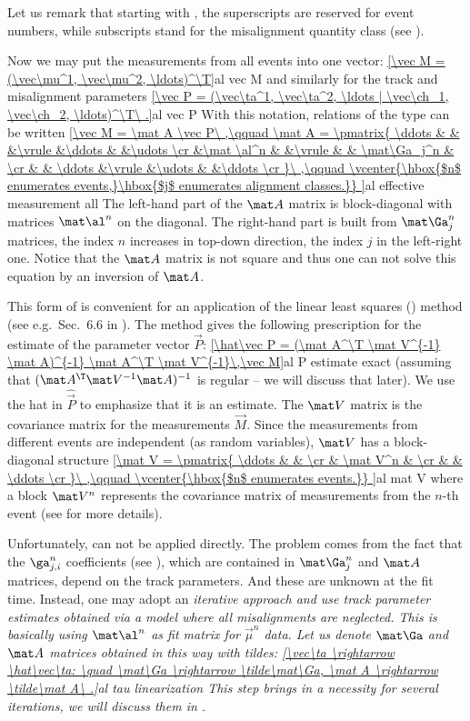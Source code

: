 Let us remark that starting with , the superscripts are reserved for event numbers, while subscripts stand for the misalignment quantity class (see ).

Now we may put the measurements from all events into one vector:
\eqref{\vec M = (\vec\mu^1, \vec\mu^2, \ldots)^\T}{al vec M}
and similarly for the track and misalignment parameters
\eqref{\vec P = (\vec\ta^1, \vec\ta^2, \ldots | \vec\ch_1, \vec\ch_2, \ldots)^\T\ .}{al vec P}
With this notation, relations of the type  can be written
\eqref{\vec M = \mat A \vec P\ ,\qquad
	\mat A = \pmatrix{
	\ddots & 		&		&\vrule	&\ddots	&				&\udots	\cr
		&\mat \al^n	&		&\vrule	&		& \mat\Ga_j^n	&	\cr
		&		& \ddots	&\vrule	&\udots	&				&\ddots	\cr
	}\ ,\qquad
	\vcenter{\hbox{$n$ enumerates events,}\hbox{$j$ enumerates alignment classes.}}
}{al effective measurement all}
The left-hand part of the $\mat A$ matrix is block-diagonal with matrices $\mat\al^n$ on the diagonal. The right-hand part is built from $\mat\Ga_j^n$ matrices, the index $n$ increases in top-down direction, the index $j$ in the left-right one. Notice that the $\mat A$ matrix is not square and thus one can not solve this equation by an inversion of $\mat A$.

This form of  is convenient for an application of the linear least squares () method (see e.g.~Sec.~6.6 in ). The method gives the following prescription for the estimate of the parameter vector $\vec P$:
\eqref{\hat\vec P = (\mat A^\T \mat V^{-1} \mat A)^{-1} \mat A^\T \mat V^{-1}\,\vec M}{al P estimate exact}
(assuming that $(\mat A^\T \mat V^{-1} \mat A)^{-1}$ is regular -- we will discuss that later). We use the hat in $\hat\vec P$ to emphasize that it is an estimate. The $\mat V$ matrix is the covariance matrix for the measurements $\vec M$. Since the measurements from different events are independent (as random variables), $\mat V$ has a block-diagonal structure
\eqref{\mat V = \pmatrix{
\ddots	&			&			\cr
		& \mat V^n	&			\cr
		&			& \ddots	\cr
	}\ ,\qquad
	\vcenter{\hbox{$n$ enumerates events.}}
}{al mat V}
where a block $\mat V^n$ represents the covariance matrix of measurements from the $n$-th event (see  for more details).

Unfortunately,  can not be applied directly. The problem comes from the fact that the $\ga^n_{j,i}$ coefficients (see ), which are contained in $\mat\Ga_j^n$ and $\mat A$ matrices, depend on the track parameters. And these are unknown at the fit time. Instead, one may adopt an \em{iterative} approach and use track parameter estimates obtained via a model where all misalignments are neglected. This is basically using $\mat \al^n$ as fit matrix for $\vec \mu^n$ data. Let us denote $\mat\Ga$ and $\mat A$ matrices obtained in this way with tildes:
\eqref{\vec\ta \rightarrow \hat\vec\ta: \quad \mat\Ga \rightarrow \tilde\mat\Ga, \mat A \rightarrow \tilde\mat A\ .}{al tau linearization}
This step brings in a necessity for several iterations, we will discuss them in .

